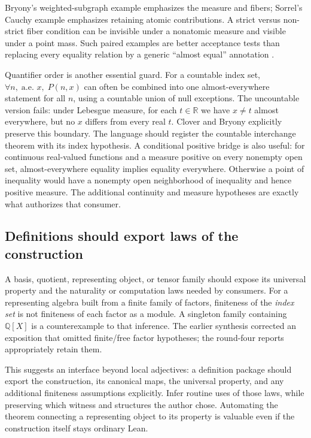 \documentclass[11pt,letterpaper]{article}
\newcommand{\Q}{\mathbb Q}\newcommand{\R}{\mathbb R}
\theoremstyle{definition}\newtheorem{definition}[proposition]{Definition}
\theoremstyle{remark}\newtheorem{remark}[proposition]{Remark}
\begin{document}
Bryony's weighted-subgraph example emphasizes the measure and fibers;
Sorrel's Cauchy example emphasizes retaining atomic contributions. A strict
versus non-strict fiber condition can be invisible under a nonatomic measure
and visible under a point mass. Such paired examples are better acceptance
tests than replacing every equality relation by a generic ``almost equal''
annotation \cite{bryony,sorrel}.

Quantifier order is another essential guard. For a countable index set,
$\forall n,\;\text{a.e. }x,\;P(n,x)$ can often be combined into one
almost-everywhere statement for all $n$, using a countable union of null
exceptions. The uncountable version fails: under Lebesgue measure, for each
$t\in\R$ we have $x\ne t$ almost everywhere, but no $x$ differs from every
real $t$. Clover and Bryony explicitly preserve this boundary. The language
should register the countable interchange theorem with its index hypothesis.
A conditional positive bridge is also useful: for continuous real-valued
functions and a measure positive on every nonempty open set, almost-everywhere
equality implies equality everywhere. Otherwise a point of inequality would
have a nonempty open neighborhood of inequality and hence positive measure.
The additional continuity and measure hypotheses are exactly what authorizes
that consumer.

\subsection{Definitions should export laws of the construction}

A basis, quotient, representing object, or tensor family should expose its
universal property and the naturality or computation laws needed by consumers.
For a representing algebra built from a finite family of factors, finiteness
of the \emph{index set} is not finiteness of each factor as a module. A singleton
family containing $\Q[X]$ is a counterexample to that inference. The earlier
synthesis corrected an exposition that omitted finite/free factor hypotheses;
the round-four reports appropriately retain them.

This suggests an interface beyond local adjectives: a definition package
should export the construction, its canonical maps, the universal property,
and any additional finiteness assumptions explicitly. Infer routine uses of
those laws, while preserving which witness and structures the author chose.
Automating the theorem connecting a representing object to its property is
valuable even if the construction itself stays ordinary Lean.
\end{document}
